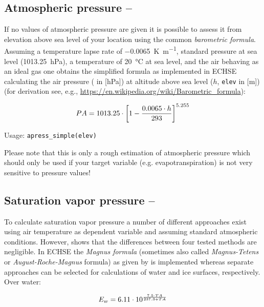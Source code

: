 \subsection{Atmospheric pressure -- \airPressure} \label{sec:meteo:apress}
If no values of atmospheric pressure are given it is possible to assess it from elevation above sea level of your location using the common \emph{barometric formula}. Assuming a temperature lapse rate of \SI{-0.0065}{\kelvin\per\metre}, standard pressure at sea level (\SI{1013.25}{\hecto\pascal}), a temperature of \SI{20}{\degreeCelsius} at sea level, and the air behaving as an ideal gas one obtains the simplified formula as implemented in ECHSE calculating the air pressure (\airPressure{} in [\si{\hecto\pascal}]) at altitude above sea level ($h$, \verb!elev! in [\si{\metre}]) (for derivation see, e.g., \url{https://en.wikipedia.org/wiki/Barometric_formula}):

\begin{equation} \label{eqn:meteo:apress}
  PA{} = 1013.25 \cdot \left[ 1 - \frac{0.0065 \cdot h}{293} \right]^{5.255}
\end{equation}

\noindent
Usage:
\verb!apress_simple(elev)!

Please note that this is only a rough estimation of atmospheric pressure which should only be used if your target variable (e.g. evapotranspiration) is not very sensitive to pressure values!



\subsection{Saturation vapor pressure -- \satVaporPressure} \label{sec:meteo:satvappress}
To calculate saturation vapor pressure a number of different approaches exist using air temperature as dependent variable and assuming standard atmospheric conditions. However,  shows that the differences between four tested methods are negligible. In ECHSE the \emph{Magnus formula} (sometimes also called \emph{Magnus-Tetens} or \emph{August-Roche-Magnus} formula) as given by \citet{Dyck1995} is implemented whereas separate approaches can be selected for calculations of water and ice surfaces, respectively.\\

\noindent
Over water:

\begin{equation} \label{eqn:meteo:satVapPressWater}
E_w{} = 6.11 \cdot 10^{\frac{7.5 \cdot TA{}}{237.3 + TA{}}}
\end{equation}

